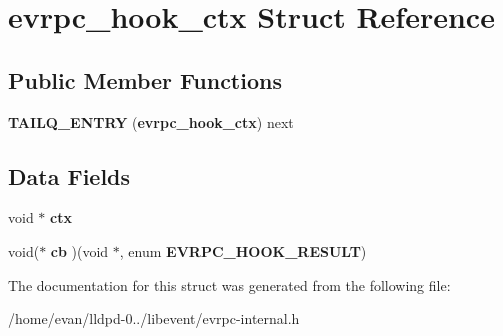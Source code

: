 \section{evrpc\-\_\-hook\-\_\-ctx \-Struct \-Reference}
\label{structevrpc__hook__ctx}
\subsection*{\-Public \-Member \-Functions}
\begin{DoxyCompactItemize}
\item 
{\bfseries \-T\-A\-I\-L\-Q\-\_\-\-E\-N\-T\-R\-Y} ({\bf evrpc\-\_\-hook\-\_\-ctx}) next\label{structevrpc__hook__ctx_a00b12a710e5790e63069b9512d8e1caa}

\end{DoxyCompactItemize}
\subsection*{\-Data \-Fields}
\begin{DoxyCompactItemize}
\item 
void $\ast$ {\bfseries ctx}\label{structevrpc__hook__ctx_a1f6d09b30c54854dfca659b7463ac207}

\item 
void($\ast$ {\bfseries cb} )(void $\ast$, enum {\bf \-E\-V\-R\-P\-C\-\_\-\-H\-O\-O\-K\-\_\-\-R\-E\-S\-U\-L\-T})\label{structevrpc__hook__ctx_aff149ad8ea00b21b64469b22be02fea8}

\end{DoxyCompactItemize}


\-The documentation for this struct was generated from the following file\-:\begin{DoxyCompactItemize}
\item 
/home/evan/lldpd-\/0../libevent/evrpc-\/internal.\-h\end{DoxyCompactItemize}
